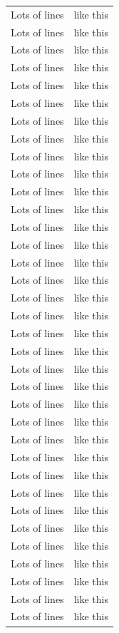 \begin{longtable}[c]{ | c | c | }
        Lots of lines & like this\\
        Lots of lines & like this\\
        Lots of lines & like this\\
        Lots of lines & like this\\
        Lots of lines & like this\\
        Lots of lines & like this\\
        Lots of lines & like this\\
        Lots of lines & like this\\
        Lots of lines & like this\\
        Lots of lines & like this\\
        Lots of lines & like this\\
        Lots of lines & like this\\
        Lots of lines & like this\\
        Lots of lines & like this\\
        Lots of lines & like this\\
        Lots of lines & like this\\
        Lots of lines & like this\\
        Lots of lines & like this\\
        Lots of lines & like this\\
        Lots of lines & like this\\
        Lots of lines & like this\\
        Lots of lines & like this\\
        Lots of lines & like this\\
        Lots of lines & like this\\
        Lots of lines & like this\\
        Lots of lines & like this\\
        Lots of lines & like this\\
        Lots of lines & like this\\
        Lots of lines & like this\\
        Lots of lines & like this\\
        Lots of lines & like this\\
        Lots of lines & like this\\
        Lots of lines & like this\\
        Lots of lines & like this\\
        Lots of lines & like this\\

\end{longtable}
